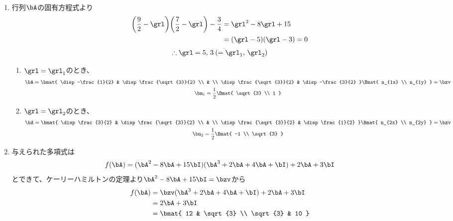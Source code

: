 \begin{ans*}
  ${}$
  \begin{enumerate}[label=\alph*)]
    \item 行列$\bA$の固有方程式より
    \begin{align}
      \biggl(\frac{9}{2} - \grl\biggr)\biggl(\frac{7}{2} - \grl\biggr) - \frac{3}{4}
      &= \grl^2 - 8\grl + 15 \\
      &= (\grl - 5)(\grl - 3) = 0 \\
    \end{align}
    \begin{gather}
      \therefore \grl = 5,\,3\:(=\grl_1,\,\grl_2)
    \end{gather}
    \begin{enumerate}[label=(\roman*)]
      \item $\grl = \grl_1$のとき、
      \begin{gather}
        \bA = \bmat{
          \disp -\frac{1}{2} & \disp\frac{\sqrt{3}}{2} \\
          & \\
          \disp\frac{\sqrt{3}}{2} & \disp -\frac{3}{2}
        }\Bmat{
          n_{1x} \\ n_{1y}
        }=\bzv \\
        \bn_1 = \frac{1}{2}\Bmat{
          \sqrt{3} \\ 1
        }
      \end{gather}
      \item $\grl = \grl_2$のとき、
      \begin{gather}
        \bA = \bmat{
          \disp \frac{3}{2} & \disp\frac{\sqrt{3}}{2} \\
          & \\
          \disp \frac{\sqrt{3}}{2} & \disp \frac{1}{2}
        }\Bmat{
          n_{2x} \\ n_{2y}
        }=\bzv \\
        \bn_2 = \frac{1}{2}\Bmat{
          -1 \\ \sqrt{3}
        }
      \end{gather}
    \end{enumerate}
    \item 与えられた多項式は
    \begin{gather}
      f(\bA)
      = (\bA^2 - 8\bA + 15\bI)(\bA^3 + 2\bA + 4\bA + \bI) + 2\bA + 3\bI
    \end{gather}
    とできて、ケーリーハミルトンの定理より$\bA^2 - 8\bA + 15\bI=\bzv$から
    \begin{align}
      f(\bA)
      &= \bzv (\bA^3 + 2\bA + 4\bA + \bI) + 2\bA + 3\bI \\
      &= 2\bA + 3\bI \\
      &= \bmat{
        12 & \sqrt{3} \\
        \sqrt{3} & 10
      }
    \end{align}
  \end{enumerate}
\end{ans*}



